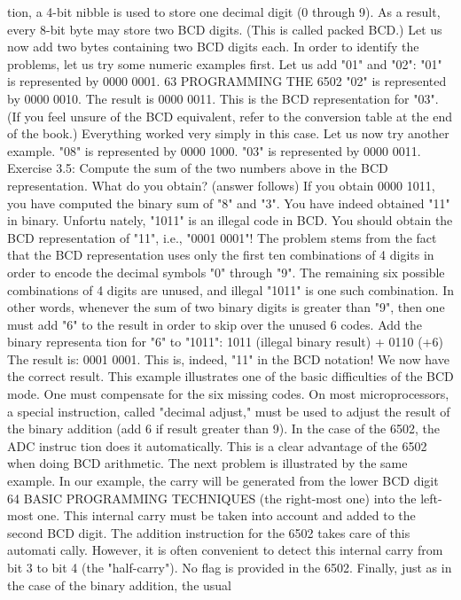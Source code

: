 \documentclass{book}
\begin{document}
tion, a 4-bit nibble is used to store one decimal digit (0 through 9).
As a result, every 8-bit byte may store two BCD digits. (This is
called packed BCD.) Let us now add two bytes containing two
BCD digits each.
In order to identify the problems, let us try some numeric
examples first.
Let us add "01" and "02":
"01" is represented by 0000 0001.
63
PROGRAMMING THE 6502
"02" is represented by 0000 0010.
The result is 0000 0011.
This is the BCD representation for "03". (If you feel unsure of the
BCD equivalent, refer to the conversion table at the end of the
book.) Everything worked very simply in this case. Let us now try
another example.
"08" is represented by 0000 1000.
"03" is represented by 0000 0011.
Exercise 3.5: Compute the sum of the two numbers above in the
BCD representation. What do you obtain? (answer follows)
If you obtain 0000 1011, you have computed the binary sum of
"8" and "3". You have indeed obtained "11" in binary. Unfortu
nately, "1011" is an illegal code in BCD. You should obtain the
BCD representation of "11", i.e., "0001 0001"!
The problem stems from the fact that the BCD representation
uses only the first ten combinations of 4 digits in order to encode
the decimal symbols "0" through "9". The remaining six possible
combinations of 4 digits are unused, and illegal "1011" is one such
combination. In other words, whenever the sum of two binary
digits is greater than "9", then one must add "6" to the result in
order to skip over the unused 6 codes. Add the binary representa
tion for "6" to "1011":
1011 (illegal binary result)
+ 0110 (+6)
The result is: 0001 0001.
This is, indeed, "11" in the BCD notation! We now have the
correct result.
This example illustrates one of the basic difficulties of the BCD
mode. One must compensate for the six missing codes. On most
microprocessors, a special instruction, called "decimal adjust,"
must be used to adjust the result of the binary addition (add 6 if
result greater than 9). In the case of the 6502, the ADC instruc
tion does it automatically. This is a clear advantage of the 6502
when doing BCD arithmetic.
The next problem is illustrated by the same example. In our
example, the carry will be generated from the lower BCD digit
64
BASIC PROGRAMMING TECHNIQUES
(the right-most one) into the left-most one. This internal carry
must be taken into account and added to the second BCD digit.
The addition instruction for the 6502 takes care of this automati
cally. However, it is often convenient to detect this internal carry
from bit 3 to bit 4 (the "half-carry"). No flag is provided in the
6502.
Finally, just as in the case of the binary addition, the usual
\end{document}
